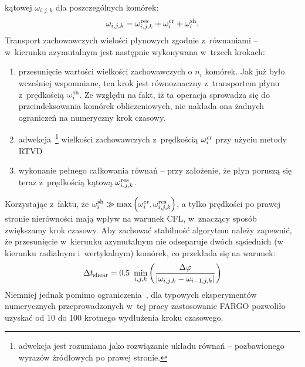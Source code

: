 kątowej $\omega_{i,j,k}$ dla poszczególnych komórek:
%
\begin{equation}
   \omega_{i,j,k} = \omega_{i,j,k}^{\rm res} + \omega_i^{\rm cr} + \omega_i^{\rm
sh}.
\end{equation}
%
Transport zachowawczych wielości płynowych zgodnie z~równaniami  --
 w~kierunku azymutalnym jest następnie wykonywana w~trzech krokach:
%
\begin{enumerate}
   \item przesunięcie wartości wielkości zachowawczych o $n_i$ komórek. Jak już
      było wcześniej wspomniane, ten krok jest równoznaczny z~transportem płynu
      z~prędkością $\omega_i^{\rm sh}$. Ze względu na fakt, iż ta operacja
      sprowadza się do przeindeksowania komórek obliczeniowych, nie nakłada ona
      żadnych ograniczeń na numeryczny krok czasowy.
   \item adwekcja~\footnote{adwekcja jest rozumiana jako rozwiązanie układu
      równań  --  pozbawionego wyrazów źródłowych po prawej
      stronie.} wielkości zachowawczych z~prędkością $\omega_i^{\rm cr}$ przy
      użyciu metody RTVD
   \item wykonanie pełnego całkowania równań  --  przy
      założenie, że płyn poruszą się teraz z~prędkością kątową
      $\omega_{i,j,k}^{\rm res}$.
\end{enumerate}
Korzystając z~faktu, że $\omega_i^{\rm sh} \gg \max\left(\omega_i^{\rm cr},
\omega_{i,j,k}^{\rm res}\right)$, a tylko prędkości po prawej stronie
nierówności mają wpływ na warunek CFL, w~znaczący sposób zwiększamy krok
czasowy. Aby zachować stabilność algorytmu należy zapewnić, że
przesunięcie w~kierunku azymutalnym nie odseparuje dwóch sąsiednich (w kierunku
radialnym i~wertykalnym) komórek, co przekłada się na warunek:
%
\begin{equation}\label{eq:tshear}
   \Delta t_{\rm shear} = 0.5 ~ \min_{i,j,k} \left( \frac{\Delta\varphi}
   {|\omega_{i,j,k} - \omega_{i-1,j,k}|} \right)
\end{equation}
%
Niemniej jednak pomimo ograniczenia~, dla typowych eksperymentów
numerycznych przeprowadzonych w~tej pracy zastosowanie FARGO pozwoliło uzyskać
od 10 do 100 krotnego wydłużenia kroku czasowego.

